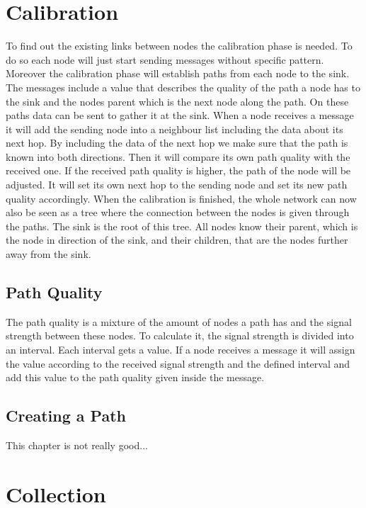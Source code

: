 \section{Calibration}
To find out the existing links between nodes the calibration phase is needed. To do so each node will just start sending messages without specific pattern. Moreover the calibration phase will establish paths from each node to the sink. The messages include a value that describes the quality of the path a node has to the sink and the nodes parent which is the next node along the path. On these paths data can be sent to gather it at the sink. When a node receives a message it will add the sending node into a neighbour list including the data about its next hop. By including the data of the next hop we make sure that the path is known into both directions. Then it will compare its own path quality with the received one. If the received path quality is higher, the path of the node will be adjusted. It will set its own next hop to the sending node and set its new path quality accordingly. When the calibration is finished, the whole network can now also be seen as a tree where the connection between the nodes is given through the paths. The sink is the root of this tree. All nodes know their parent, which is the node in direction of the sink, and their children, that are the nodes further away from the sink.
\subsection{Path Quality}
The path quality is a mixture of the amount of nodes a path has and the signal strength between these nodes. To calculate it, the signal strength is divided into an interval. Each interval gets a value. If a node receives a message it will assign the value according to the received signal strength and the defined interval and add this value to the path quality given inside the message. 
\subsection{Creating a Path}
This chapter is not really good...

\section{Collection}

